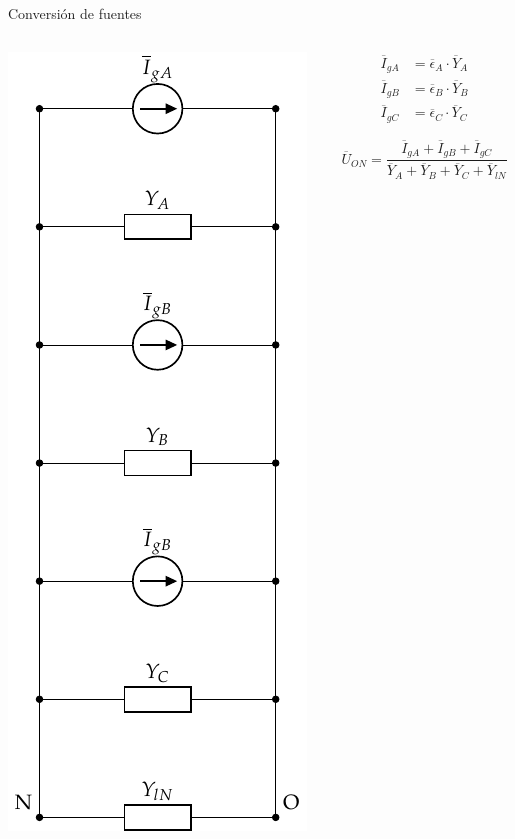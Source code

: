 \documentclass[aspectratio=169, usenames,svgnames,dvipsnames]{beamer}
\begin{document}
\begin{frame}[label={sec:orgcc7d6a1}]{Conversión de fuentes}
\begin{columns}
\begin{column}{0.4\columnwidth}
\begin{center}
\includegraphics[height=0.9\textheight]{../figs/CircuitoTrifasicaGeneralizado3.pdf}
\end{center}
\end{column}

\begin{column}{0.7\columnwidth}
\begin{align*}
  \overline{I}_{gA} &= \overline{\epsilon}_A \cdot \overline{Y}_A\\
  \overline{I}_{gB} &= \overline{\epsilon}_B \cdot \overline{Y}_B\\
  \overline{I}_{gC} &= \overline{\epsilon}_C \cdot \overline{Y}_C
\end{align*}

\[
  \overline{U}_{ON} = \frac{\overline{I}_{gA} + \overline{I}_{gB} + \overline{I}_{gC}}{\overline{Y}_A + \overline{Y}_B + \overline{Y}_C + \overline{Y}_{lN}}
\]
\end{column}
\end{columns}
\end{frame}
\end{document}
